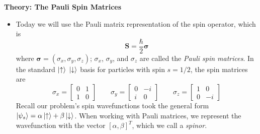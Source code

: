\documentclass[11pt, a4paper]{article}
\renewcommand{\vec}[1]{\bm{#1}} %
\newcommand{\ua}{\uparrow}  %
\newcommand{\da}{\downarrow}  %
\begin{document}
\textbf{Theory: The Pauli Spin Matrices}
\begin{itemize}
	\item  Today we will use the Pauli matrix representation of the spin operator, which is
	\begin{equation*}
		\vec{S} = \frac{\hbar}{2}\vec{\sigma}
	\end{equation*}
	where $ \vec{\sigma} = (\sigma_{x}, \sigma_{y}, \sigma_{z})$; $ \sigma_{x}$, $\sigma_{y}$, and $ \sigma_{z} $ are called the \textit{Pauli spin matrices}. In the standard $ \ket{\ua}$ $\ket{\da} $ basis for particles with spin $ s = 1/2 $, the spin matrices are
	\begin{equation*}
		\sigma_{x} = 
		\begin{bmatrix}
			0 & 1\\
			1 & 0
		\end{bmatrix}
		\qquad
		\sigma_{y} = 
		\begin{bmatrix}
			0 & -i\\
			i & 0
		\end{bmatrix}
		\qquad
		\sigma_{z} = 
		\begin{bmatrix}
			1 & 0\\
			0 & -i
		\end{bmatrix}
	\end{equation*}
	Recall our problem's spin wavefunctions took the general form $ \ket{\psi_{s}} = \alpha \ket{\ua} + \beta \ket{\da} $. When working with Pauli matrices, we represent the wavefunction with the vector $ [\alpha, \beta]^{T} $, which we call a \textit{spinor}.
\end{itemize}
\end{document}

